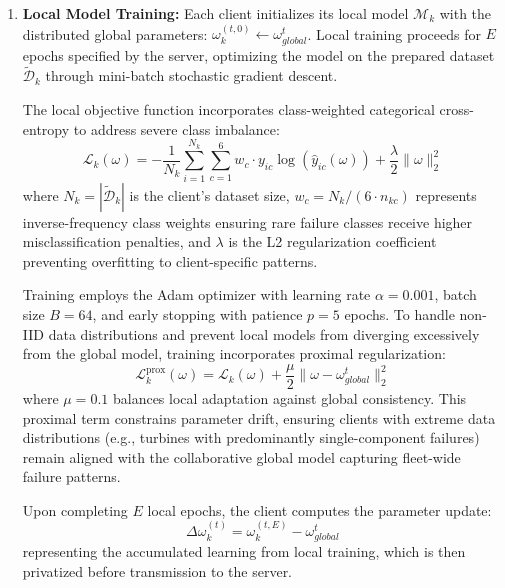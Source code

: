 \documentclass[12pt]{article}
\begin{document}
\begin{enumerate}
    \item \textbf{Local Model Training:} 
    Each client initializes its local model $\mathcal{M}_k$ with the distributed global parameters: $\omega_k^{(t,0)} \leftarrow \omega_{global}^{t}$. Local training proceeds for $E$ epochs specified by the server, optimizing the model on the prepared dataset $\tilde{\mathcal{D}}_k$ through mini-batch stochastic gradient descent.
    
    The local objective function incorporates class-weighted categorical cross-entropy to address severe class imbalance:
    \begin{equation}
    \mathcal{L}_k(\omega) = -\frac{1}{N_k}\sum_{i=1}^{N_k} \sum_{c=1}^{6} w_c \cdot y_{ic} \log\left(\hat{y}_{ic}(\omega)\right) + \frac{\lambda}{2}\|\omega\|_2^2
    \label{eq:local_loss}
    \end{equation}
    where $N_k = |\tilde{\mathcal{D}}_k|$ is the client's dataset size, $w_c = N_k/(6 \cdot n_{kc})$ represents inverse-frequency class weights ensuring rare failure classes receive higher misclassification penalties, and $\lambda$ is the L2 regularization coefficient preventing overfitting to client-specific patterns.
    
    Training employs the Adam optimizer with learning rate $\alpha = 0.001$, batch size $B = 64$, and early stopping with patience $p = 5$ epochs. To handle non-IID data distributions and prevent local models from diverging excessively from the global model, training incorporates proximal regularization:
    \begin{equation}
    \mathcal{L}_k^{\text{prox}}(\omega) = \mathcal{L}_k(\omega) + \frac{\mu}{2}\|\omega - \omega_{global}^{t}\|_2^2
    \label{eq:proximal_loss}
    \end{equation}
    where $\mu = 0.1$ balances local adaptation against global consistency. This proximal term constrains parameter drift, ensuring clients with extreme data distributions (e.g., turbines with predominantly single-component failures) remain aligned with the collaborative global model capturing fleet-wide failure patterns.
    
    Upon completing $E$ local epochs, the client computes the parameter update:
    \begin{equation}
    \Delta\omega_k^{(t)} = \omega_k^{(t,E)} - \omega_{global}^{t}
    \label{eq:parameter_delta}
    \end{equation}
    representing the accumulated learning from local training, which is then privatized before transmission to the server.


\end{enumerate}
\end{document}
